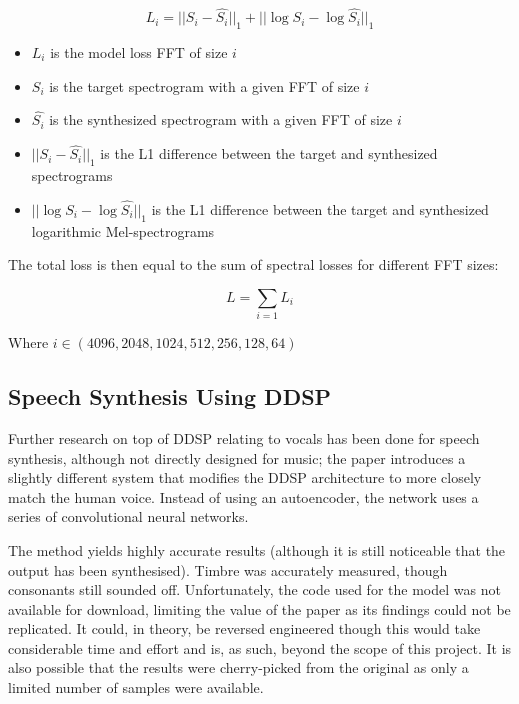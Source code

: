 \vspace{0.5cm}
\vspace{0.5cm}

\begin{equation}
    L_i = ||S_i - \hat{S_i}||_1 + ||\log{S_i} - \log\hat{S_i}||_1
\end{equation}

\begin{itemize}
    \item $L_i$ is the model loss FFT of size $i$
    \item $S_i$ is the target spectrogram with a given FFT of size $i$
    \item $\hat{S_i}$ is the synthesized spectrogram with a given FFT of size $i$
    \item $||S_i - \hat{S_i}||_1$ is the L1 difference between the target and synthesized spectrograms
    \item $||\log{S_i} - \log\hat{S_i}||_1$ is the L1 difference between the target and synthesized logarithmic Mel-spectrograms
\end{itemize}

The total loss is then equal to the sum of spectral losses for different FFT sizes:

\begin{equation}
    L = \sum_{i=1} L_i
\end{equation}

Where $i \in (4096, 2048, 1024, 512, 256, 128, 64)$

\subsection{Speech Synthesis Using DDSP}

Further research on top of DDSP relating to vocals has been done for speech synthesis, although not directly designed for music; the paper introduces a slightly different system that modifies the DDSP architecture to more closely match the human voice\cite{SpeechDDSP}. Instead of using an autoencoder, the network uses a series of convolutional neural networks.

The method yields highly accurate results (although it is still noticeable that the output has been synthesised). Timbre was accurately measured, though consonants still sounded off. Unfortunately, the code used for the model was not available for download, limiting the value of the paper as its findings could not be replicated. It could, in theory, be reversed engineered though this would take considerable time and effort and is, as such, beyond the scope of this project. It is also possible that the results were cherry-picked from the original as only a limited number of samples were available.

